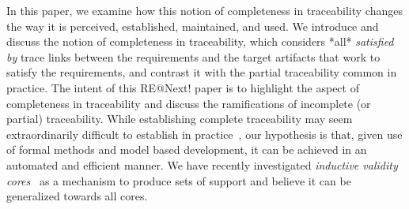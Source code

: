 In this paper, we examine how this notion of completeness in traceability changes the way it is perceived, established, maintained, and used. We introduce and discuss the notion of completeness in traceability, which considers *all* \emph{satisfied by} trace links between the requirements and the target artifacts that work to satisfy the requirements, and contrast it with the partial traceability common in practice.  The intent of this RE@Next! paper is to highlight the aspect of completeness in traceability and discuss the ramifications of incomplete (or partial) traceability.    While establishing complete traceability may seem extraordinarily difficult to establish in practice~\cite{stravsunskas2002traceability}, our hypothesis is that, given use of formal methods and model based development, it can be achieved in an automated and efficient manner.  We have recently investigated {\em inductive validity cores}~\cite{2016arXiv160304276G} as a mechanism to produce sets of support and believe it can be generalized towards all cores.
